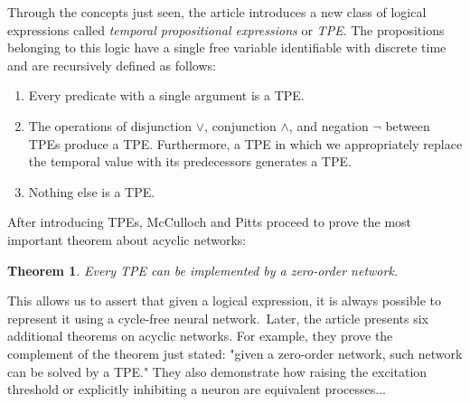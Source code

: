 \documentclass[10pt]{article}
\newtheorem{thm}{Theorem}
\begin{document}
Through the concepts just seen, the article introduces a new class of logical expressions called \emph{temporal propositional expressions} or \emph{TPE}. The propositions belonging to this logic have a single free variable identifiable with discrete time and are recursively defined as follows:
\begin{enumerate}
	\item Every predicate with a single argument is a TPE.
	\item The operations of disjunction $\vee$, conjunction $\wedge$, and negation $\neg$ between TPEs produce a TPE. Furthermore, a TPE in which we appropriately replace the temporal value with its predecessors generates a TPE.
	\item Nothing else is a TPE.
\end{enumerate}
After introducing TPEs, McCulloch and Pitts proceed to prove the most important theorem about acyclic networks:
\begin{thm}
	Every TPE can be implemented by a zero-order network.
\end{thm}
This allows us to assert that given a logical expression, it is always possible to represent it using a cycle-free neural network.\
Later, the article presents six additional theorems on acyclic networks. For example, they prove the complement of the theorem just stated: "given a zero-order network, such network can be solved by a TPE." They also demonstrate how raising the excitation threshold or explicitly inhibiting a neuron are equivalent processes$\ldots$\
\end{document}
